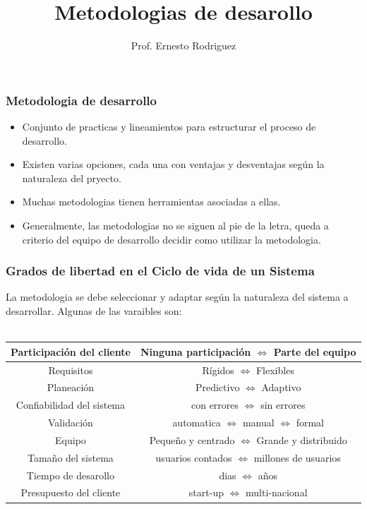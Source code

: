 \documentclass{beamer}
\title{Metodologias de desarollo}
\author{Prof. Ernesto Rodriguez}
\institute{
    Universidad del Itsmo \\
    \medskip \textit{erodriguez@unis.edu.gt}
}
\date[\today]{}
\begin{document}
\begin{frame}
\titlepage
\end{frame}

\begin{frame}
    \frametitle{Metodologia de desarrollo}
    \begin{itemize}
        \item{Conjunto de practicas y lineamientos para
        estructurar el proceso de desarrollo.}
        \item{Existen varias opciones, cada una con ventajas
        y desventajas seg\'un la naturaleza del pryecto.}
        \item{Muchas metodologias tienen herramientas
        asociadas a ellas.}
        \item{Generalmente, las metodologias no se siguen
        al pie de la letra, queda a criterio del equipo de
        desarrollo decidir como utilizar la metodologia.}
    \end{itemize}
\end{frame}

\begin{frame}
    \frametitle{Grados de libertad en el Ciclo de vida de un Sistema}
    La metodologia se debe seleccionar y adaptar seg\'un la naturaleza
    del sistema a desarrollar. Algunas de las varaibles son:\\~\\
    \begin{tabular}{|c|c|}
        \hline
        Participaci\'on del cliente & Ninguna participaci\'on $\Leftrightarrow$ Parte del equipo \\
        \hline
        Requisitos & R\'igidos $\Leftrightarrow$ Flexibles\\
        \hline
        Planeaci\'on & Predictivo $\Leftrightarrow$ Adaptivo \\ 
        \hline
        Confiabilidad del sistema & con errores $\Leftrightarrow$ sin errores \\
        \hline
        Validaci\'on & automatica $\Leftrightarrow$ manual $\Leftrightarrow$ formal \\
        \hline
        Equipo & Peque\~no y centrado $\Leftrightarrow$ Grande y distribuido \\
        \hline
        Tama\~no del sistema & usuarios contados $\Leftrightarrow$ millones de usuarios \\
        \hline
        Tiempo de desarollo & dias $\Leftrightarrow$ a\~nos \\
        \hline
        Presupuesto del cliente & start-up $\Leftrightarrow$ multi-nacional \\
        \hline
    \end{tabular}
\end{frame}
\end{document}
